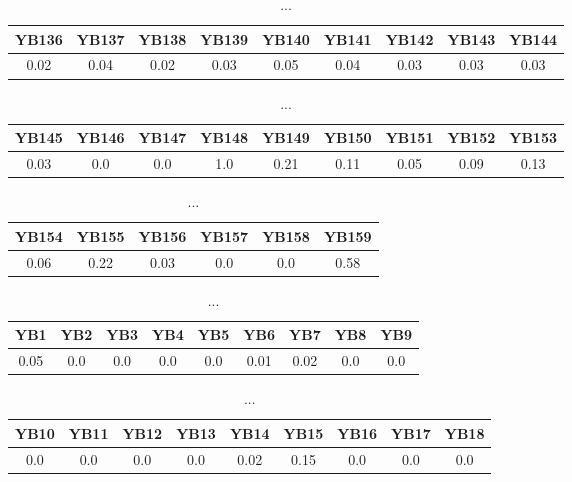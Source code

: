 \documentclass[]{article}
\begin{document}
\begin{table}[h]
      \centering
      \begin{tabular}{|c|c|c|c|c|c|c|c|c|}
            \hline
            YB136 & YB137 & YB138 & YB139 & YB140 & YB141 & YB142 & YB143 & YB144 \\
            \hline
            0.02  & 0.04  & 0.02  & 0.03  & 0.05  & 0.04  & 0.03  & 0.03  & 0.03  \\
            \hline
      \end{tabular}
      \caption{...}
\end{table}
\begin{table}[h]
      \centering
      \begin{tabular}{|c|c|c|c|c|c|c|c|c|}
            \hline
            YB145 & YB146 & YB147 & YB148 & YB149 & YB150 & YB151 & YB152 & YB153 \\
            \hline
            0.03  & 0.0   & 0.0   & 1.0   & 0.21  & 0.11  & 0.05  & 0.09  & 0.13  \\
            \hline
      \end{tabular}
      \caption{...}
\end{table}
\begin{table}[h]
      \centering
      \begin{tabular}{|c|c|c|c|c|c|}
            \hline
            YB154 & YB155 & YB156 & YB157 & YB158 & YB159 \\
            \hline
            0.06  & 0.22  & 0.03  & 0.0   & 0.0   & 0.58  \\
            \hline
      \end{tabular}
      \caption{...}
\end{table}
\begin{table}[h]
      \centering
      \begin{tabular}{|c|c|c|c|c|c|c|c|c|}
            \hline
            YB1  & YB2 & YB3 & YB4 & YB5 & YB6  & YB7  & YB8 & YB9 \\
            \hline
            0.05 & 0.0 & 0.0 & 0.0 & 0.0 & 0.01 & 0.02 & 0.0 & 0.0 \\
            \hline
      \end{tabular}
      \caption{...}
\end{table}
\begin{table}[h]
      \centering
      \begin{tabular}{|c|c|c|c|c|c|c|c|c|}
            \hline
            YB10 & YB11 & YB12 & YB13 & YB14 & YB15 & YB16 & YB17 & YB18 \\
            \hline
            0.0  & 0.0  & 0.0  & 0.0  & 0.02 & 0.15 & 0.0  & 0.0  & 0.0  \\
            \hline
      \end{tabular}
      \caption{...}
\end{table}
\end{document}
